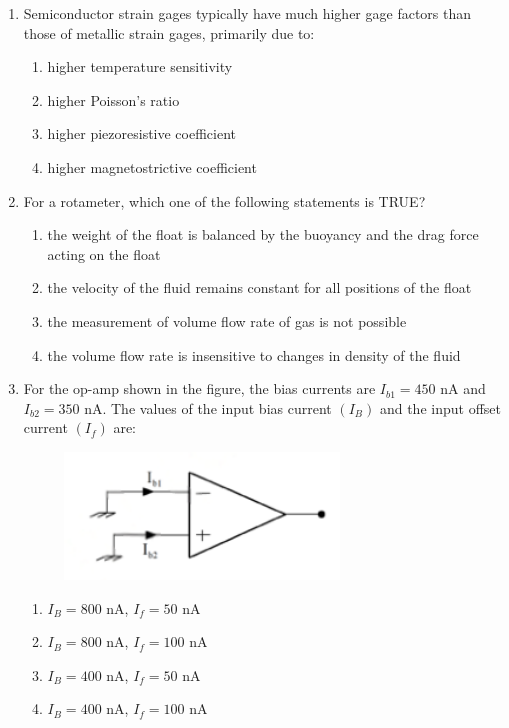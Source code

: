 \documentclass[journal,12pt,onecolumn]{IEEEtran}
\theoremstyle{remark}
\begin{document}
\begin{enumerate}
    \item Semiconductor strain gages typically have much higher gage factors than those of metallic strain gages, primarily due to:
    \begin{enumerate}
        \item higher temperature sensitivity
        \item higher Poisson's ratio
        \item higher piezoresistive coefficient
        \item higher magnetostrictive coefficient
    \end{enumerate}

    \vspace{0.5cm}
    
    \item For a rotameter, which one of the following statements is TRUE?
    \begin{enumerate}
        \item the weight of the float is balanced by the buoyancy and the drag force acting on the float
        \item the velocity of the fluid remains constant for all positions of the float
        \item the measurement of volume flow rate of gas is not possible
        \item the volume flow rate is insensitive to changes in density of the fluid
    \end{enumerate}

    \vspace{0.5cm}
    
    \item For the op-amp shown in the figure, the bias currents are $I_{b1} = 450$ nA and $I_{b2} = 350$ nA. The values of the input bias current $(I_B)$ and the input offset current $(I_f)$ are:
    \begin{figure}[H]
        \centering
        \includegraphics[width=0.3\columnwidth]{q13}
        \caption*{}
        \label{fig:placeholder}
    \end{figure}
    \begin{multicols}{2}
        \begin{enumerate}
            \item $I_B = 800$ nA, $I_f = 50$ nA
            \item $I_B = 800$ nA, $I_f = 100$ nA
            \item $I_B = 400$ nA, $I_f = 50$ nA
            \item $I_B = 400$ nA, $I_f = 100$ nA
        \end{enumerate}
    \end{multicols}
    

\end{enumerate}
\end{document}
